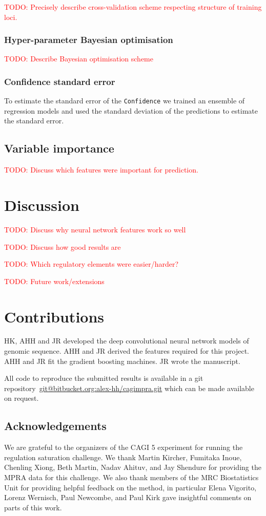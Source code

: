 \documentclass{article}
\newcommand{\todo}[1]{\textcolor{red}{TODO: #1}}
\begin{document}
\todo{Precisely describe cross-validation scheme respecting structure of
training loci.}



\subsubsection*{Hyper-parameter Bayesian optimisation}

\todo{Describe Bayesian optimisation scheme}


\subsubsection*{Confidence standard error}

To estimate the standard error of the \texttt{Confidence} we trained an
ensemble of regression models and used the standard deviation of the
predictions to estimate the standard error.


\subsection*{Variable importance}

\todo{Discuss which features were important for prediction.}


\section*{Discussion}

\todo{Discuss why neural network features work so well}

\todo{Discuss how good results are}

\todo{Which regulatory elements were easier/harder?}

\todo{Future work/extensions}


\section*{Contributions}

HK, AHH and JR developed the deep convolutional neural network models of
genomic sequence. AHH and JR derived the features required for this
project. AHH and JR fit the gradient boosting machines. JR wrote the
manuscript.

All code to reproduce the submitted results is available in a git
repository~\url{git@bitbucket.org:alex-hh/cagimpra.git} which can be made
available on request.


\subsection*{Acknowledgements}

We are grateful to the organizers of the CAGI 5 experiment for running the
regulation saturation challenge. We thank Martin Kircher, Fumitaka Inoue,
Chenling Xiong, Beth Martin, Nadav Ahituv, and Jay Shendure for providing the
MPRA data for this challenge. We also thank members of the MRC Biostatistics
Unit for providing helpful feedback on the method, in particular Elena
Vigorito, Lorenz Wernisch, Paul Newcombe, and Paul Kirk gave insightful
comments on parts of this work.


%
%
\printbibliography
\end{document}
